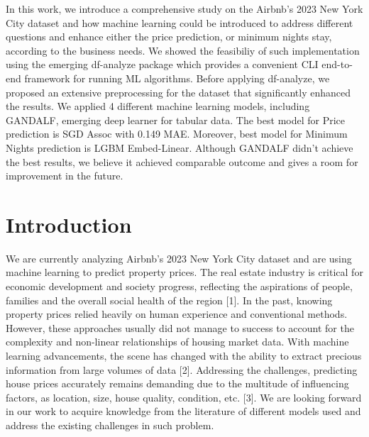 \documentclass[a4paper,12pt]{article}
\begin{document}
In this work, we introduce a comprehensive study on the Airbnb's 2023 New York City dataset and how machine learning could be introduced to address different questions and enhance either the price prediction, or minimum nights stay, according to the business needs. We showed the feasibiliy of such implementation using the emerging df-analyze package which provides a convenient CLI end-to-end framework for running ML algorithms. Before applying df-analyze, we proposed an extensive preprocessing for the dataset that significantly enhanced the results. We applied 4 different machine learning models, including GANDALF, emerging deep learner for tabular data. The best model for Price prediction is SGD Assoc with 0.149 MAE. Moreover, best model for Minimum Nights prediction is LGBM Embed-Linear. Although GANDALF didn't achieve the best results, we believe it achieved comparable outcome and gives a room for improvement in the future.

\section*{Introduction}

We are currently analyzing Airbnb's 2023 New York City dataset and are using machine learning to predict property prices. The real estate industry is critical for economic development and society progress, reflecting the aspirations of people, families and the overall social health of the region [1]. In the past, knowing property prices relied heavily on human experience and conventional methods. However, these approaches usually did not manage to success to account for the complexity and non-linear relationships of housing market data. With machine learning advancements, the scene has changed with the ability to extract precious information from large volumes of data [2]. Addressing the challenges, predicting house prices accurately remains demanding due to the multitude of influencing factors, as location, size, house quality, condition, etc. [3]. We are looking forward in our work to acquire knowledge from the literature of different models used and address the existing challenges in such problem.
\end{document}

